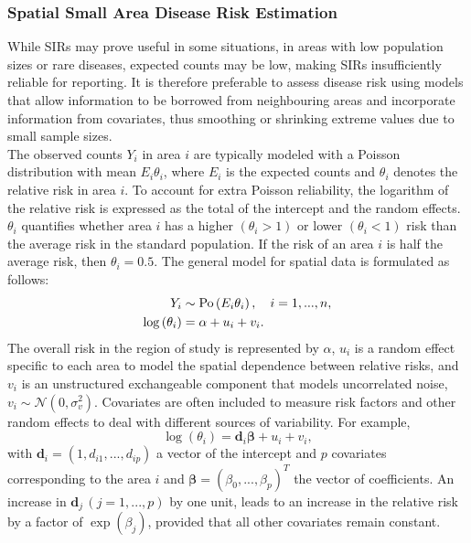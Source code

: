 \documentclass[12pt]{book}
\begin{document}
\subsubsection{Spatial Small Area Disease Risk Estimation}
While SIRs may prove useful in some situations, in areas with low population sizes or rare diseases, expected counts may be low, making SIRs insufficiently reliable for reporting. It is therefore preferable to assess disease risk using models that allow information to be borrowed from neighbouring areas and incorporate information from covariates, thus smoothing or shrinking extreme values due to small sample sizes. \\
The observed counts $Y_i$ in area $i$ are typically modeled with a Poisson distribution with mean $E_i\theta_i$, where $E_i$ is the expected counts and $\theta_i$ denotes the relative risk in area $i$. To account for extra Poisson reliability, the logarithm of the relative risk is expressed as the total of the intercept and the random effects. $\theta_i$ quantifies whether area $i$ has a higher $\left(\theta_i >1\right)$ or lower $\left(\theta_i <1\right)$ risk than the average risk in the standard population. If the risk of an area $i$ is half the average risk, then $\theta_i = 0.5$. The general model for spatial data is formulated as follows:
\begin{align}
    Y_i&\sim\hbox{Po}\left(E_i\theta_i\right), \hspace{10pt} i=1,...,n,\\
    \log\left(\theta_i\right)&=\alpha+u_i+v_i.
\end{align}
The overall risk in the region of study is represented by $\alpha$, $u_i$ is a random effect specific to each area to model the spatial dependence between relative risks, and $v_i$ is an unstructured exchangeable component that models uncorrelated noise, $v_i\sim\mathcal{N}\left(0,\sigma_v^2\right)$. Covariates are often included to measure risk factors and other random effects to deal with different sources of variability. For example,
\begin{equation*}
    \log\left(\theta_i\right)=\pmb{d}_i\pmb{\beta}+u_i+v_i,
\end{equation*}
with $\pmb{d}_i = \left(1,d_{i1},...,d_{ip}\right)$ a vector of the intercept and $p$ covariates corresponding to the area $i$ and $\pmb{\beta}=\left(\beta_0,...,\beta_p\right)^T$ the vector of coefficients. An increase in $\pmb{d}_j\,\left(j = 1,...,p\right)$ by one unit, leads to an increase in the relative risk by a factor of $\exp\left(\beta_j\right)$, provided that all other covariates remain constant. \\
\end{document}
